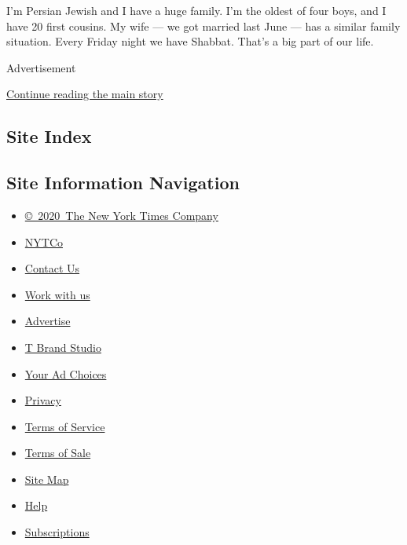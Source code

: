 I'm Persian Jewish and I have a huge family. I'm the oldest of four
boys, and I have 20 first cousins. My wife --- we got married last June
--- has a similar family situation. Every Friday night we have Shabbat.
That's a big part of our life.

Advertisement

\protect\hyperlink{after-bottom}{Continue reading the main story}

\hypertarget{site-index}{%
\subsection{Site Index}\label{site-index}}

\hypertarget{site-information-navigation}{%
\subsection{Site Information
Navigation}\label{site-information-navigation}}

\begin{itemize}
\tightlist
\item
  \href{https://help.nytimes.com/hc/en-us/articles/115014792127-Copyright-notice}{©~2020~The
  New York Times Company}
\end{itemize}

\begin{itemize}
\tightlist
\item
  \href{https://www.nytco.com/}{NYTCo}
\item
  \href{https://help.nytimes.com/hc/en-us/articles/115015385887-Contact-Us}{Contact
  Us}
\item
  \href{https://www.nytco.com/careers/}{Work with us}
\item
  \href{https://nytmediakit.com/}{Advertise}
\item
  \href{http://www.tbrandstudio.com/}{T Brand Studio}
\item
  \href{https://www.nytimes.com/privacy/cookie-policy\#how-do-i-manage-trackers}{Your
  Ad Choices}
\item
  \href{https://www.nytimes.com/privacy}{Privacy}
\item
  \href{https://help.nytimes.com/hc/en-us/articles/115014893428-Terms-of-service}{Terms
  of Service}
\item
  \href{https://help.nytimes.com/hc/en-us/articles/115014893968-Terms-of-sale}{Terms
  of Sale}
\item
  \href{https://spiderbites.nytimes.com}{Site Map}
\item
  \href{https://help.nytimes.com/hc/en-us}{Help}
\item
  \href{https://www.nytimes.com/subscription?campaignId=37WXW}{Subscriptions}
\end{itemize}
